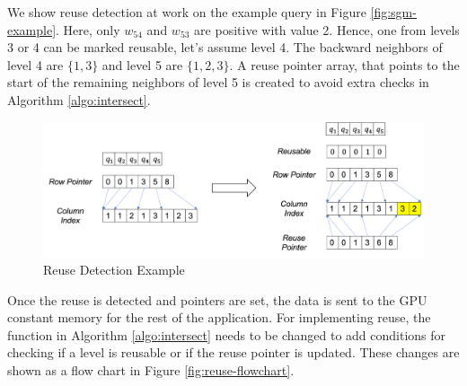 We show reuse detection at work on the example query in Figure \ref{fig:sgm-example}.
Here, only $w_{54}$ and $w_{53}$ are positive with value 2. Hence, one from levels 3 or 4 can be marked reusable, let's assume level 4.
The backward neighbors of level 4 are $\{1,3\}$ and level 5 are $\{1,2,3\}$.
A reuse pointer array, that points to the start of the remaining neighbors of level 5 is created to avoid extra checks in Algorithm \ref{algo:intersect}.
\begin{figure}
    \includegraphics[width=\textwidth]{fig/improvements/Reuse-resorting.png}
    \caption{Reuse Detection Example}
    \label{fig:reuse-detection}
\end{figure}
Once the reuse is detected and pointers are set, the data is sent to the GPU constant memory for the rest of the application. For implementing reuse, the function in Algorithm \ref{algo:intersect} needs to be changed to add conditions for checking if a level is reusable or if the reuse pointer is updated.
These changes are shown as a flow chart in Figure \ref{fig:reuse-flowchart}.
